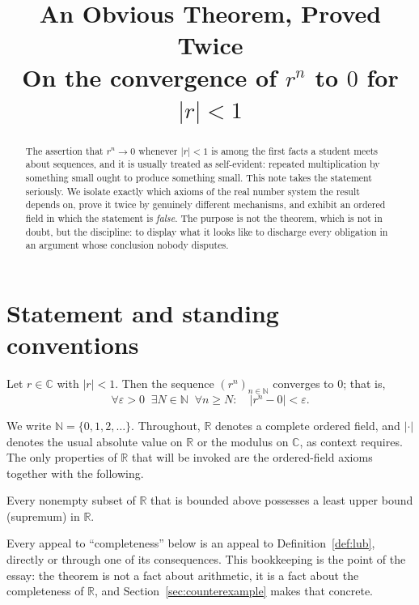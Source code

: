 \documentclass{essay}
\title{An Obvious Theorem, Proved Twice\\[2pt]
\large On the convergence of $r^{n}$ to $0$ for $|r| < 1$}
\author{}
\date{}
\begin{document}
\maketitle

\begin{abstract}
\noindent
The assertion that $r^{n} \to 0$ whenever $|r| < 1$ is among the first facts a
student meets about sequences, and it is usually treated as self-evident: repeated
multiplication by something small ought to produce something small. This note takes
the statement seriously. We isolate exactly which axioms of the real number system
the result depends on, prove it twice by genuinely different mechanisms, and exhibit
an ordered field in which the statement is \emph{false}. The purpose is not the
theorem, which is not in doubt, but the discipline: to display what it looks like to
discharge every obligation in an argument whose conclusion nobody disputes.
\end{abstract}

\tableofcontents

\section{Statement and standing conventions}

\begin{theorem}\label{thm:main}
Let $r \in \mathbb{C}$ with $|r| < 1$. Then the sequence $(r^{n})_{n \in \mathbb{N}}$
converges to $0$; that is,
\[
  \forall \varepsilon > 0 \;\; \exists N \in \mathbb{N} \;\; \forall n \geq N :
  \quad |r^{n} - 0| < \varepsilon .
\]
\end{theorem}

We write $\mathbb{N} = \{0, 1, 2, \dots\}$. Throughout, $\mathbb{R}$ denotes a complete
ordered field, and $|\cdot|$ denotes the usual absolute value on $\mathbb{R}$ or the
modulus on $\mathbb{C}$, as context requires. The only properties of $\mathbb{R}$ that
will be invoked are the ordered-field axioms together with the following.

\begin{definition}\label{def:lub}
Every nonempty subset of $\mathbb{R}$ that is bounded above possesses a least upper
bound (supremum) in $\mathbb{R}$.
\end{definition}

Every appeal to ``completeness'' below is an appeal to Definition~\ref{def:lub},
directly or through one of its consequences. This bookkeeping is the point of the
essay: the theorem is not a fact about arithmetic, it is a fact about the
completeness of $\mathbb{R}$, and Section~\ref{sec:counterexample} makes that
concrete.
\end{document}

